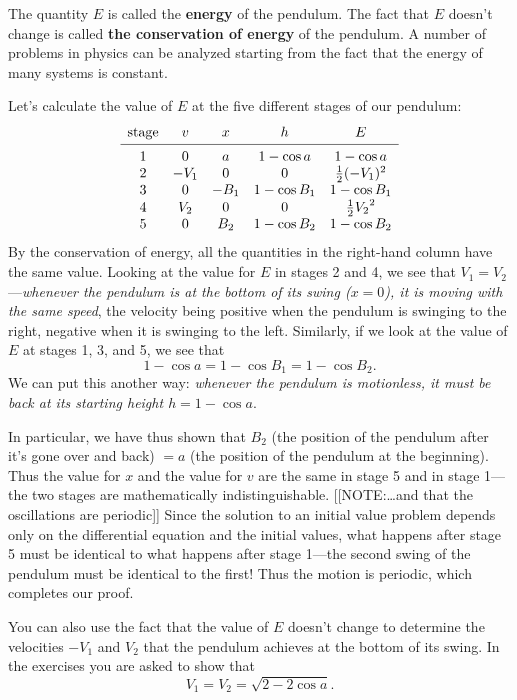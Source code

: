 The quantity $E$ is called the {\bf energy\/} of the
pendulum.  The fact that $E$ doesn't change is called {\bf the
  conservation of energy} of the
pendulum.  A number of problems in physics can be analyzed starting
from the fact that the energy of many systems is constant.

Let's calculate the value of $E$ at the five different stages of our pendulum:
{\setlength{\arraycolsep}{12pt}
	\[
\begin{array}{ccccc}
	\mbox{stage}	& v	& x	& h 	& E \\ [2pt]
	\hline \\ [-9pt]
	1		& 0	& a	& 1-\cos{a} & 1-\cos{a} \\
	2		&-V_1&0&0& \tfrac{1}{2}(-V_1)^2 \\
	3		&0&-B_1&1-\cos{B_1} & 1-\cos{B_1} \\
	4		&V_2&0&0&\tfrac{1}{2} {V_2}^2 \\	5		& 0 	& B_2	& 1-\cos{B_2} & 1-\cos{B_2} 
	\end{array}
\] } 
By the conservation of energy, all the quantities in the
right-hand column have the same value.  Looking at the value for $E$
in stages 2 and 4, we see that $V_1=V_2$---{\em whenever the pendulum
  is at the bottom of its swing ($x=0$), it is moving with the same
  speed}, the velocity being positive when the pendulum is swinging to
the right, negative when it is swinging to the left.  Similarly, if we
look at the value of $E$ at stages 1, 3, and 5, we see that
	\[
1 - \cos{a} = 1 - \cos{B_1}= 1 - \cos{B_2}.
\]
We can put this another way: {\em whenever the pendulum is motionless,
  it must be back at its starting height $h = 1 - \cos{a}$}.

In particular, we have thus shown that $B_2$ (the position of the pendulum after it's gone over and back) $= a$ (the position of the pendulum at the beginning).  Thus the value for $x$ and the value for $v$ are the same in stage 5 and in stage 1---the two stages are mathematically indistinguishable.
	[[NOTE:\ldots and that the oscillations are periodic]]
Since the solution to an initial value problem depends only on the differential equation and the initial values, what happens after stage 5 must be identical to what happens after stage 1---the second swing of the pendulum must be identical to the first!  Thus the motion is periodic, which completes our proof.


You can also use the fact that the value of $E$ doesn't change to
determine the velocities $-V_1$ and $V_2$ that the pendulum achieves
at the bottom of its swing.  In the exercises you are asked to show
that
	\[
V_1 = V_2 = \sqrt{2 - 2\cos{a}}.
\]

